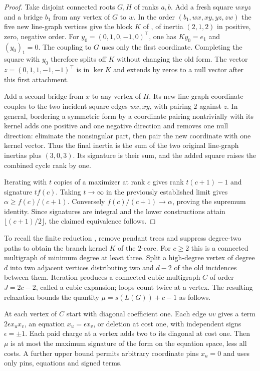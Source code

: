 \documentclass[11pt]{article}
\begin{document}
\begin{proof}
Take disjoint connected roots $G,H$ of ranks $a,b$. Add a fresh square $wxyz$ and a bridge $b_1$ from any vertex of $G$ to $w$. In the order $(b_1,wx,xy,yz,zw)$ the five new line-graph vertices give the block $K$ of \cite[Theorem 5.3 and Appendix A.4]{PP}, of inertia $(2,1,2)$ in positive, zero, negative order. For $y_0=(0,1,0,-1,0)^\top$, one has $Ky_0=e_1$ and $(y_0)_1=0$. The coupling to $G$ uses only the first coordinate. Completing the square with $y_0$ therefore splits off $K$ without changing the old form. The vector $z=(0,1,1,-1,-1)^\top$ is in $\ker K$ and extends by zeros to a null vector after this first attachment.

Add a second bridge from $x$ to any vertex of $H$. Its new line-graph coordinate couples to the two incident square edges $wx,xy$, with pairing $2$ against $z$. In general, bordering a symmetric form by a coordinate pairing nontrivially with its kernel adds one positive and one negative direction and removes one null direction: eliminate the nonsingular part, then pair the new coordinate with one kernel vector. Thus the final inertia is the sum of the two original line-graph inertias plus $(3,0,3)$. Its signature is their sum, and the added square raises the combined cycle rank by one.

Iterating with $t$ copies of a maximizer at rank $c$ gives rank $t(c+1)-1$ and signature $t f(c)$. Taking $t\to\infty$ in the previously established limit gives $\alpha\ge f(c)/(c+1)$. Conversely $f(c)/(c+1)\to\alpha$, proving the supremum identity. Since signatures are integral and the lower constructions attain $\lfloor(c+1)/2\rfloor$, the claimed equivalence follows.
\end{proof}
To recall the finite reduction \cite[Sections 2--3]{prev}, remove pendant trees and suppress degree-two paths to obtain the branch kernel $K$ of the $2$-core. For $c\ge2$ this is a connected multigraph of minimum degree at least three. Split a high-degree vertex of degree $d$ into two adjacent vertices distributing two and $d-2$ of the old incidences between them. Iteration produces a connected cubic multigraph $C$ of order $J=2c-2$, called a cubic expansion; loops count twice at a vertex. The resulting relaxation bounds the quantity $\mu=s(L(G))+c-1$ as follows.
\begin{lemma}\label{form}
At each vertex of $C$ start with diagonal coefficient one. Each edge $uv$ gives a term $2\epsilon x_ux_v$, an equation $x_u=\epsilon x_v$, or deletion at cost one, with independent signs $\epsilon=\pm1$. Each paid charge at a vertex adds two to its diagonal at cost one. Then $\mu$ is at most the maximum signature of the form on the equation space, less all costs. A further upper bound permits arbitrary coordinate pins $x_u=0$ and uses only pins, equations and signed terms.
\end{lemma}
\end{document}

